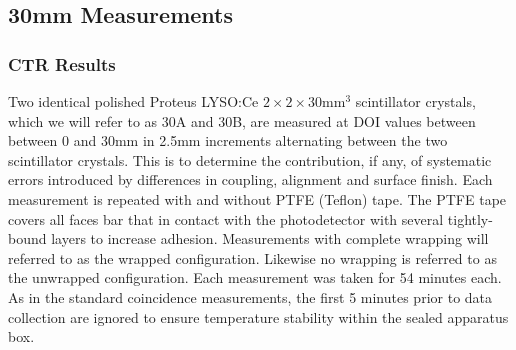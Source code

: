 \subsection{30mm Measurements}
\label{sec:30mm}
\subsubsection{CTR Results}
Two identical polished Proteus LYSO:Ce $2\times2\times30$mm$^3$ scintillator crystals, which we will refer to as 30A and 30B, are measured at DOI values between between 0 and 30mm in 2.5mm increments alternating between the two scintillator crystals. This is to determine the contribution, if any, of systematic errors introduced by differences in coupling, alignment and surface finish. Each measurement is repeated with and without PTFE (Teflon) tape. The PTFE tape covers all faces bar that in contact with the photodetector with several tightly-bound layers to increase adhesion. Measurements with complete wrapping will referred to as the wrapped configuration. Likewise no wrapping is referred to as the unwrapped configuration. Each measurement was taken for 54 minutes each. As in the standard coincidence measurements, the first 5 minutes prior to data collection are ignored to ensure temperature stability within the sealed apparatus box.


